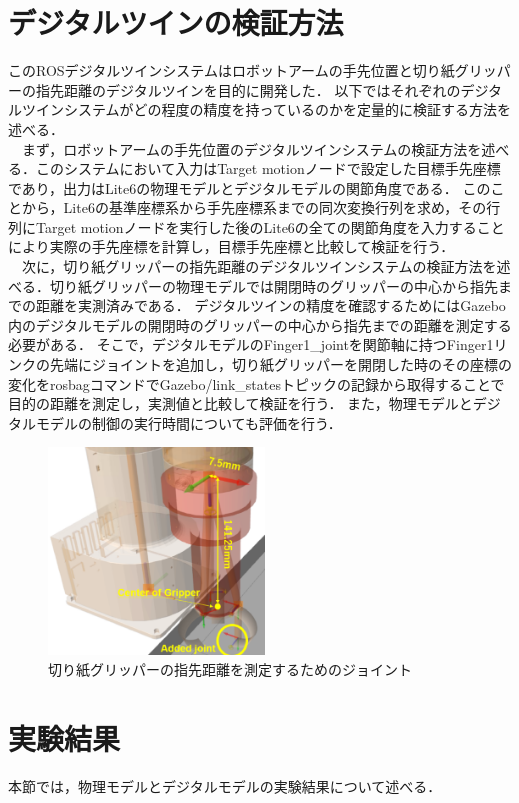 \section{デジタルツインの検証方法}
このROSデジタルツインシステムはロボットアームの手先位置と切り紙グリッパーの指先距離のデジタルツインを目的に開発した．
以下ではそれぞれのデジタルツインシステムがどの程度の精度を持っているのかを定量的に検証する方法を述べる．\\
　まず，ロボットアームの手先位置のデジタルツインシステムの検証方法を述べる．このシステムにおいて入力はTarget motionノードで設定した目標手先座標であり，出力はLite6の物理モデルとデジタルモデルの関節角度である．
このことから，Lite6の基準座標系から手先座標系までの同次変換行列を求め，その行列にTarget motionノードを実行した後のLite6の全ての関節角度を入力することにより実際の手先座標を計算し，目標手先座標と比較して検証を行う．\\
　次に，切り紙グリッパーの指先距離のデジタルツインシステムの検証方法を述べる．切り紙グリッパーの物理モデルでは開閉時のグリッパーの中心から指先までの距離を実測済みである．
デジタルツインの精度を確認するためにはGazebo内のデジタルモデルの開閉時のグリッパーの中心から指先までの距離を測定する必要がある．
そこで，デジタルモデルのFinger1\_jointを関節軸に持つFinger1リンクの先端にジョイントを追加し，切り紙グリッパーを開閉した時のその座標の変化をrosbagコマンドでGazebo/link\_statesトピックの記録から取得することで目的の距離を測定し，実測値と比較して検証を行う．
また，物理モデルとデジタルモデルの制御の実行時間についても評価を行う．

\begin{figure}[htbt]
    \centering
     \includegraphics[height=55mm]{measure_joint.eps}
     \caption{切り紙グリッパーの指先距離を測定するためのジョイント}
     \label{fig:f2}
\end{figure}

\section{実験結果}
本節では，物理モデルとデジタルモデルの実験結果について述べる．
